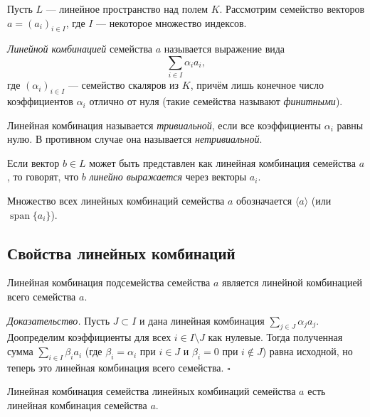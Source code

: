\documentclass[a4paper,12pt]{article}
\theoremstyle{definition}
\theoremstyle{plain}
\theoremstyle{remark}
\begin{document}
	Пусть \( L \) — линейное пространство над полем \( K \). Рассмотрим семейство векторов \( a = (a_i)_{i \in I} \), где \( I \) — некоторое множество индексов.
	
	\begin{tcolorbox}[colback=blue!5, colframe=blue!40!black, title=Определение]
		\textit{Линейной комбинацией} семейства \( a \) называется выражение вида
		\[
		\sum_{i \in I} \alpha_i a_i,
		\]
		где \( (\alpha_i)_{i \in I} \) — семейство скаляров из \( K \), причём лишь конечное число коэффициентов \( \alpha_i \) отлично от нуля (такие семейства называют \textit{финитными}).
	\end{tcolorbox}
	
	Линейная комбинация называется \textit{тривиальной}, если все коэффициенты \( \alpha_i \) равны нулю. В противном случае она называется \textit{нетривиальной}.
	
	Если вектор \( b \in L \) может быть представлен как линейная комбинация семейства \( a \), то говорят, что \( b \) \textit{линейно выражается} через векторы \( a_i \).
	
	Множество всех линейных комбинаций семейства \( a \) обозначается \( \langle a \rangle \) (или \( \operatorname{span}\{a_i\} \)).
	
	\subsection{Свойства линейных комбинаций}
	
	\begin{tcolorbox}[colback=green!5, colframe=green!50!black, title=Свойство 1]
		Линейная комбинация подсемейства семейства \( a \) является линейной комбинацией всего семейства \( a \).
	\end{tcolorbox}
	
	\medskip
	\textit{Доказательство.}
	Пусть \( J \subset I \) и дана линейная комбинация \( \sum_{j \in J} \alpha_j a_j \). Доопределим коэффициенты для всех \( i \in I \setminus J \) как нулевые. Тогда полученная сумма \( \sum_{i \in I} \beta_i a_i \) (где \( \beta_i = \alpha_i \) при \( i \in J \) и \( \beta_i = 0 \) при \( i \notin J \)) равна исходной, но теперь это линейная комбинация всего семейства. \hfill \(\square\)
	
	\begin{tcolorbox}[colback=green!5, colframe=green!50!black, title=Свойство 2]
		Линейная комбинация семейства линейных комбинаций семейства \( a \) есть линейная комбинация семейства \( a \).
	\end{tcolorbox}
	
\end{document}
